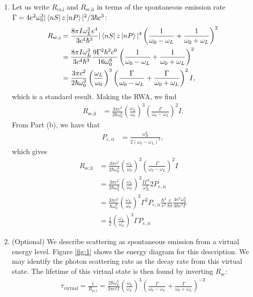 \documentclass{article}
\theoremstyle{definition}
\newcommand{\f}[2]{\frac{#1}{#2}}
\newcommand{\lp}{\left(}
\newcommand{\rp}{\right)}
\begin{document}
\begin{enumerate}[label=(\alph*)]
\begin{enumerate}[label=(\roman*)]
		\item Let us write $R_\text{cs,i}$ and $R_\text{sc,ii}$ in terms of the spontaneous emission rate $\Gamma = 4e^2 \omega_0^3 |\bra{nS}z\ket{nP}|^2/3\hbar c^3$: 
		\begin{align*}
			R_\text{sc,i} &= \f{8\pi I\omega_L^3 e^4}{3 c^4 \hbar^3} |\bra{nS} z \ket{nP}|^4 \lp \f{1}{\omega_0 - \omega_L} + \f{1}{\omega_0 + \omega_L} \rp^2 \\
			&= \f{8\pi I\omega_L^3 }{3 c^4 \hbar^3} \f{9\Gamma^2 \hbar^2 c^6}{16\omega_0^6}  \lp \f{1}{\omega_0 - \omega_L} + \f{1}{\omega_0 + \omega_L} \rp^2\\
			&= \f{3\pi c^2}{2\hbar \omega_0^3}\lp \f{\omega_L}{\omega_0} \rp^3 \lp \f{\Gamma}{\omega_0 - \omega_L} + \f{\Gamma}{\omega_0 + \omega_L} \rp^2 I,
		\end{align*}
	which is a standard result. Making the RWA, we find
	\begin{align*}
		R_\text{sc,ii} &= \f{3\pi c^2}{2\hbar \omega_0^3}\lp \f{\omega_L}{\omega_0} \rp^3 \lp \f{\Gamma}{\omega_0 - \omega_L}  \rp^2 I.
	\end{align*}
	From Part (b), we have that
	\begin{align*}
		P_{e,ii} &= \f{\omega_R^2}{2(\omega_0 - \omega_L)^2},
	\end{align*}
	which gives
	\begin{align*}
		R_\text{sc,ii} &=  \f{3\pi c^2}{2\hbar \omega_0^3}\lp \f{\omega_L}{\omega_0} \rp^3 \lp \f{\Gamma}{\omega_0 - \omega_L}  \rp^2 I \\
		&= \f{3\pi c^2}{2\hbar \omega_0^3}\lp \f{\omega_L}{\omega_0} \rp^3 \f{I\Gamma^2 }{\omega_R^2} 2P_{e,ii}\\
		&= \f{3\pi c^2}{\hbar \omega_0^3}\lp \f{\omega_L}{\omega_0} \rp^3 \Gamma^2 P_{e,ii} \f{\hbar^2}{e^2}\f{c}{8\pi} \f{4e^2\omega_0^3}{3\hbar c^3 \Gamma}\\
		&= \boxed{\f{ 1}{2}\lp \f{\omega_L}{\omega_0} \rp^3 \Gamma P_{e,ii}}
	\end{align*}
	
	
	
	
		\item (Optional) We describe scattering as spontaneous emission from a virtual energy level. Figure \ref{fig:1} shows the energy diagram for this description. We may identify the photon scattering rate as the decay rate from this virtual state. The lifetime of this virtual state is then found by inverting $R_\text{sc}$: 
		\begin{align*}
		\tau_\text{virtual} = \f{1}{R_\text{sc,i}} = 
		\f{2\hbar \omega_0^3}{ 3\pi c^2 I  }
		\lp \f{\omega_0}{\omega_L} \rp^3 \lp \f{\Gamma}{\omega_0 - \omega_L} + \f{\Gamma}{\omega_0 + \omega_L} \rp^{-2} 
		\end{align*}
		

\end{enumerate}
\end{enumerate}
\end{document}
